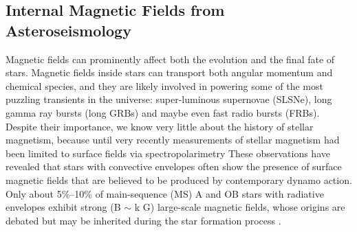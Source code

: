\subsection{Internal Magnetic Fields from Asteroseismology}

Magnetic fields can prominently affect both the evolution and the final fate of stars. Magnetic fields inside stars can transport both angular momentum and chemical species, and they are likely involved in powering some of the most puzzling transients in the universe: super-luminous supernovae (SLSNe), long gamma ray bursts (long GRBs) and maybe even fast radio bursts (FRBs). Despite their importance, we know very little about the history of stellar magnetism, because until very recently measurements of stellar magnetism had been limited to surface fields via spectropolarimetry
{\color{green} These observations have revealed that stars with convective envelopes often show the presence of surface magnetic fields that are believed to be produced by contemporary dynamo action. Only about 5\%–10\% of main-sequence (MS) A and OB stars with radiative envelopes exhibit strong (B $\sim$ k G) large-scale magnetic fields, whose origins are debated but may be inherited during the star formation process \citep[fossil fields, see e.g.,][]{2012ASPC..464..405W}.}